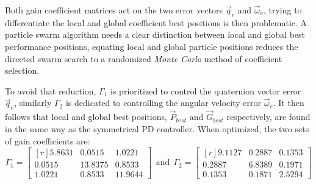Both gain coefficient matrices act on the two error vectors $\vec{q}_e$ and $\vec{\omega}_e$, trying to differentiate the local and global coefficient best positions is then problematic. A particle swarm algorithm needs a clear distinction between local and global best performance positions, equating local and global particle positions reduces the directed swarm search to a randomized \emph{Monte Carlo} method of coefficient selection.
\par
To avoid that reduction, $\Gamma_1$ is prioritized to control the quaternion vector error $\vec{q}_e$, similarly $\Gamma_2$ is dedicated to controlling the angular velocity error $\vec{\omega}_e$. It then follows that local and global best positions, $\vec{P}_{best}$ and $\vec{G}_{best}$ respectively, are found in the same way as the symmetrical PD controller. When optimized, the two sets of gain coefficients are:
\begin{equation}\label{eq:optimized-IBC}
\Gamma_1 = \begin{bmatrix*}[r]
5.8631 & 0.0515 & 1.0221\\
0.0515 & 13.8375 & 0.8533\\
1.0221 & 0.8533 & 11.9644
\end{bmatrix*}
~~\text{and}~~
\Gamma_2 = \begin{bmatrix*}[r]
9.1127 & 0.2887 & 0.1353\\
0.2887 & 6.8389 & 0.1971\\
0.1353 & 0.1871 & 2.5294
\end{bmatrix*}
\end{equation}
